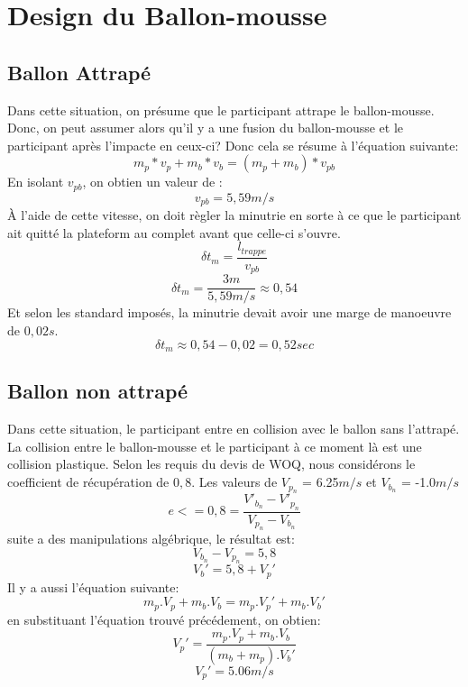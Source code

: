 \documentclass[12pt]{article}
\begin{document}
\section{Design du Ballon-mousse}
\subsection{Ballon Attrapé}
Dans cette situation, on présume que le participant attrape le ballon-mousse. Donc, on peut assumer alors qu'il y a une fusion du ballon-mousse et le participant après l'impacte en ceux-ci? Donc cela se résume à l'équation suivante:
\begin{equation}
m_p*v_p + m_b*v_b = (m_p + m_b)*v_{pb}
\end{equation}
En isolant $v_{pb}$, on obtien un valeur de :
\begin{equation}
v_{pb} = 5,59m/s
\end{equation}
À l'aide de cette vitesse, on doit règler la minutrie en sorte à ce que le participant ait quitté la plateform au complet avant que celle-ci s'ouvre.
\begin{equation}
\delta t_m = \frac{l_{trappe}}{v_{pb}}
\end{equation}
\begin{equation}
\delta t_m = \frac{3m}{5,59m/s} \approx{0,54}
\end{equation}
Et selon les standard imposés, la minutrie devait avoir une marge de manoeuvre de $0,02s$.
\begin{equation}
\delta t_m \approx{0,54 - 0,02} = 0,52sec
\end{equation}
\subsection{Ballon non attrapé}
Dans cette situation, le participant entre en collision avec le ballon sans l'attrapé. La collision entre le ballon-mousse et le participant à ce moment là est une collision plastique. Selon les requis du devis de WOQ, nous considérons le coefficient de récupération de $0,8$. Les valeurs de $V_{p_n}$ = 6.25$m/s$ et $V_{b_n}$ = -1.0$m/s$
\begin{equation}
e <= 0,8 = \frac{V'_{b_n} - V'_{p_n}}{V_{p_n} - V_{b_n}}
\end{equation}
suite a des manipulations algébrique, le résultat est:
\begin{equation}
{V_{b_n} - V_{p_n}} = 5,8
\end{equation}
\begin{equation}
V_b' = 5,8 + V_p'
\end{equation}
Il y a aussi l'équation suivante:
\begin{equation}
m_p.V_p + m_b.V_b = m_p.V_p' + m_b.V_b'
\end{equation}
\noindent
en substituant l'équation trouvé précédement, on obtien:
\begin{equation}
V_p' = \frac{m_p.V_p + m_b.V_b}{(m_b + m_p).V_b'}
\end{equation}
\begin{equation}
V_p' = 5.06m/s
\end{equation}
\end{document}
